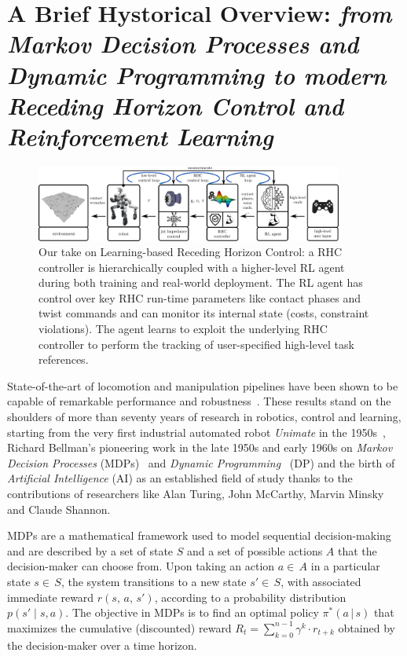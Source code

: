 \section{A Brief Hystorical Overview: \textnormal{\textit{from Markov Decision Processes and Dynamic Programming to modern Receding Horizon Control and Reinforcement Learning}}}
\begin{figure}[t]
	\centering
	\vspace{0.1cm}
	\includegraphics[width=0.9\textwidth]{imgs/learning_based_rhc.pdf}
	\caption{Our take on Learning-based Receding Horizon Control: a RHC controller is hierarchically coupled with a higher-level RL agent during both training and real-world deployment. The RL agent has control over key RHC run-time parameters like contact phases and twist commands and can monitor its internal state (costs, constraint violations). The agent learns to exploit the underlying RHC controller to perform the tracking of user-specified high-level task references.}
	\label{fig:lrhc_arch}
	\vspace{-0.3cm}
\end{figure}
State-of-the-art of locomotion and manipulation pipelines have been shown to be capable of remarkable performance and robustness~\cite{rl:schneider2023learning,rl:miki2024learning,web::atlas_grip_boston_dyn,web::lrhc_boston_dyn}. These results stand on the shoulders of more than seventy years of research in robotics, control and learning, starting from the very first industrial automated robot \textit{Unimate} in the 1950s~\cite{origins:xu2018fourth}, Richard Bellman's pioneering work in the late 1950s and early 1960s on \textit{Markov Decision Processes} (MDPs)~\cite{rl:bellman1957markovian} and \textit{Dynamic Programming}~\cite{rl:bellman1960dynamic} (DP) and the birth of \textit{Artificial Intelligence} (AI) as an established field of study thanks to the contributions of researchers like Alan Turing, John McCarthy, Marvin Minsky and Claude Shannon.

MDPs are a mathematical framework used to model sequential decision-making and are described by a set of state $S$ and a set of possible actions $A$ that the decision-maker can choose from. Upon taking an action $a\in\,A$ in a particular state $s\in\,S$, the system transitions to a new state $s'\in\,S$, with associated immediate reward $r(s,\,a,\,s')$, according to a probability distribution $p(s'\mid s, a)$. The objective in MDPs is to find an optimal policy $\pi^{*}(a\,\vert\,s)$ that maximizes the cumulative (discounted) reward $R_t = \sum_{k=0}^{n-1} \gamma^k \cdot r_{t+k}$ obtained by the decision-maker over a time horizon.

